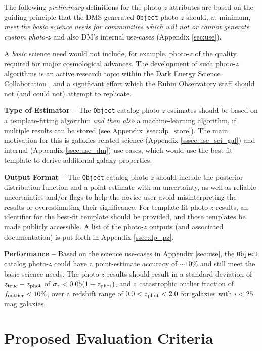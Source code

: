 \documentclass[DM,lsstdraft,toc]{lsstdoc}
\begin{document}
The following {\it preliminary} definitions for the photo-$z$ attributes are based on the guiding principle that the DMS-generated {\tt Object} photo-$z$ should, at minimum, {\it meet the basic science needs for communities which will not or cannot generate custom photo-$z$} and also DM's internal use-cases (Appendix \ref{sec:use}).

A {\it basic} science need would not include, for example, photo-$z$ of the quality required for major cosmological advances.
The development of such photo-$z$ algorithms is an active research topic within the Dark Energy Science Collaboration \citep{2018arXiv180901669T}, and a significant effort which the Rubin Observatory staff should not (and could not) attempt to replicate. 

{\bf Type of Estimator --} 
The {\tt Object} catalog photo-$z$ estimates should be based on a template-fitting algorithm {\it and then also} a machine-learning algorithm, if multiple results can be stored (see Appendix \ref{ssec:dp_store}).
The main motivation for this is galaxies-related science (Appendix \ref{sssec:use_sci_gal}) and internal (Appendix \ref{ssec:use_dm}) use-cases, which would use the best-fit template to derive additional galaxy properties.

{\bf Output Format --} 
The {\tt Object} catalog photo-$z$ should include the posterior distribution function and a point estimate with an uncertainty, as well as reliable uncertainties and/or flags to help the novice user avoid misinterpreting the results or overestimating their significance.
For template-fit photo-$z$ results, an identifier for the best-fit template should be provided, and those templates be made publicly accessible.
A list of the photo-$z$ outputs (and associated documentation) is put forth in Appendix \ref{ssec:dp_pz}.

{\bf Performance --} 
Based on the science use-cases in Appendix \ref{sec:use}, the {\tt Object} catalog photo-$z$ could have a point-estimate accuracy of $\sim10\%$ and still meet the basic science needs.
The photo-$z$ results should result in a standard deviation of $z_{\rm true}-z_{\rm phot}$ of $\sigma_z < 0.05(1+z_{\rm phot})$, and a catastrophic outlier fraction of $f_{\rm outlier} < 10\%$, over a redshift range of $0.0 < z_{\rm phot} < 2.0$ for galaxies with $i<25$ mag galaxies.


\clearpage
\section{Proposed Evaluation Criteria} \label{sec:eval}
\end{document}

